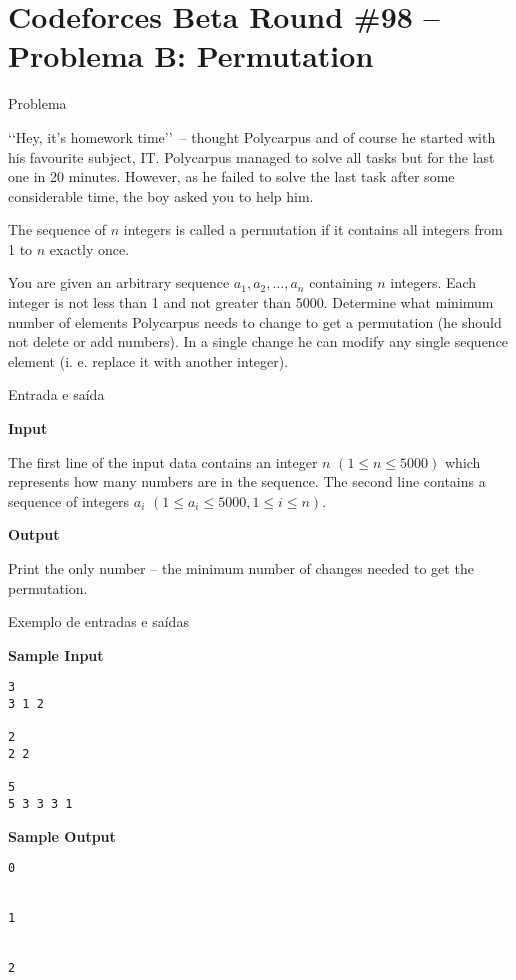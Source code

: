 \section{Codeforces Beta Round \#98 -- Problema B: Permutation}

\begin{frame}[fragile]{Problema}

\lq\lq Hey, it's homework time\rq\rq\ -- thought Polycarpus and of course he started with his favourite subject, IT. Polycarpus managed to solve all tasks but for the last one in 20 minutes. However, as he failed to solve the last task after some considerable time, the boy asked you to help him.

The sequence of $n$ integers is called a permutation if it contains all integers from 1 to $n$ exactly once.

You are given an arbitrary sequence $a_1, a_2, \ldots, a_n$ containing $n$ integers. Each integer 
is not less than 1 and not greater than 5000. Determine what minimum number of elements Polycarpus needs to change to get a permutation (he should not delete or add numbers). In a single change he can modify any single sequence element (i. e. replace it with another integer).

\end{frame}

\begin{frame}[fragile]{Entrada e saída}

\textbf{Input}

The first line of the input data contains an integer $n$ $(1\leq n\leq 5000)$ which represents how 
many numbers are in the sequence. The second line contains a sequence of integers 
$a_i$ $(1\leq a_i\leq 5000, 1\leq i\leq n)$.

\textbf{Output}

Print the only number -- the minimum number of changes needed to get the permutation.

\end{frame}

\begin{frame}[fragile]{Exemplo de entradas e saídas}

\begin{minipage}[t]{0.5\textwidth}
\textbf{Sample Input}
\begin{verbatim}
3
3 1 2

2
2 2

5
5 3 3 3 1
\end{verbatim}
\end{minipage}
\begin{minipage}[t]{0.45\textwidth}
\textbf{Sample Output}
\begin{verbatim}
0


1


2


\end{verbatim}
\end{minipage}
\end{frame}

